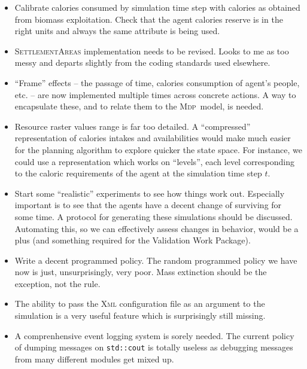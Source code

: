 \documentclass[a4paper,10pt]{article}
\newcommand{\mdp}{\textsc{Mdp}}
\begin{document}
\begin{itemize}
\item Calibrate calories consumed by simulation time step with calories as obtained from biomass exploitation. Check that the
agent calories reserve is in the right units and always the same attribute is being used.
\item \textsc{SettlementAreas} implementation needs to be revised. Looks to me as too messy and departs slightly from the 
coding standards used elsewhere.
\item ``Frame'' effects -- the passage of time, calories consumption of agent's people, etc. -- are now implemented multiple
times across concrete actions. A way to encapsulate these, and to relate them to the \mdp~model, is needed.
\item Resource raster values range is far too detailed. A ``compressed'' representation of calories intakes and availabilities
would make much easier for the planning algorithm to explore quicker the state space. For instance, we could use a 
representation which works on ``levels'', each level corresponding to the caloric requirements of the agent at the 
simulation time step $t$.
\item Start some ``realistic'' experiments to see how things work out. Especially important is to see that the agents have
a decent change of surviving for some time. A protocol for generating these simulations should be discussed. Automating
this, so we can effectively assess changes in behavior, would be a plus (and something required for the Validation Work
Package).
\item Write a decent programmed policy. The random programmed policy we have now is just, unsurprisingly, very poor. Mass
extinction should be the exception, not the rule.
\item The ability to pass the \textsc{Xml} configuration file as an argument to the simulation is a very useful feature
which is surprisingly still missing.
\item A comprenhensive event logging system is sorely needed. The current policy of dumping messages on \texttt{std::cout}
is totally useless as debugging messages from many different modules get mixed up.
\end{itemize}
\end{document}
